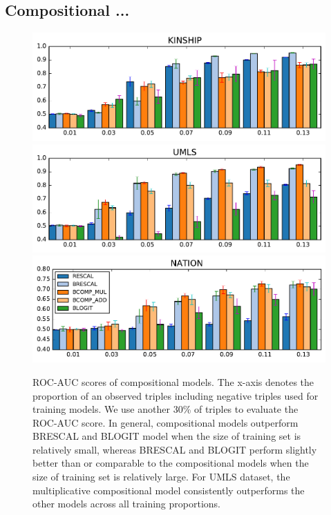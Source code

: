 \subsection{Compositional ...}
\begin{figure}[t]
	\centering
	\includegraphics[width=\linewidth]{images/comp_training_error_kinship_small.pdf}
	\includegraphics[width=\linewidth]{images/comp_training_error_umls_small.pdf}			
	\includegraphics[width=\linewidth]{images/comp_training_error_nation_small.pdf}				
	\caption{\label{fig:r_vs_br} ROC-AUC scores of compositional models. The x-axis denotes the proportion of an observed triples including negative triples used for training models. We  use another 30\% of triples to evaluate the ROC-AUC score. In general, compositional models outperform BRESCAL and BLOGIT model when the size of training set is relatively small, whereas BRESCAL and BLOGIT perform slightly better than or comparable to the compositional models when the size of training set is relatively large. For UMLS dataset, the multiplicative compositional model consistently outperforms the other models across all training proportions.}
\end{figure} 

